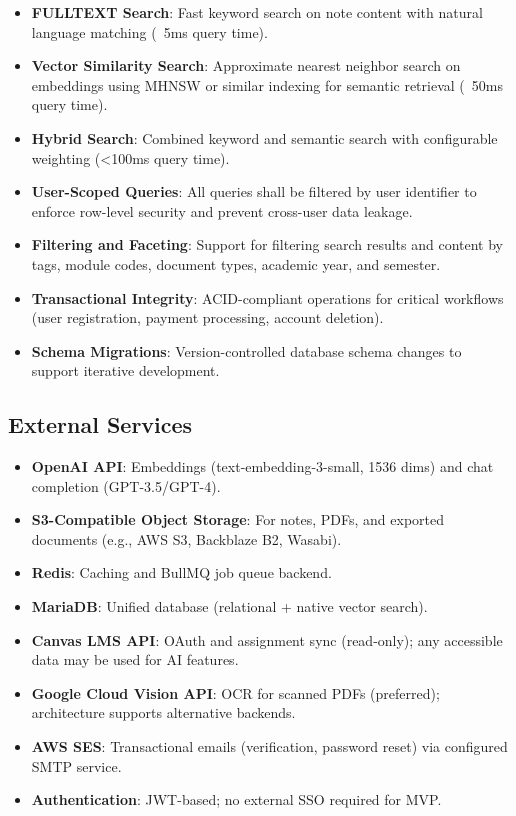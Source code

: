 \documentclass[12pt,a4paper]{article}
\begin{document}
\begin{itemize}
    \item \textbf{FULLTEXT Search}: Fast keyword search on note content with natural language matching (~5ms query time).
    \item \textbf{Vector Similarity Search}: Approximate nearest neighbor search on embeddings using MHNSW or similar indexing for semantic retrieval (~50ms query time).
    \item \textbf{Hybrid Search}: Combined keyword and semantic search with configurable weighting (<100ms query time).
    \item \textbf{User-Scoped Queries}: All queries shall be filtered by user identifier to enforce row-level security and prevent cross-user data leakage.
    \item \textbf{Filtering and Faceting}: Support for filtering search results and content by tags, module codes, document types, academic year, and semester.
    \item \textbf{Transactional Integrity}: ACID-compliant operations for critical workflows (user registration, payment processing, account deletion).
    \item \textbf{Schema Migrations}: Version-controlled database schema changes to support iterative development.
\end{itemize}

\subsection{External Services}

\begin{itemize}
    \item \textbf{OpenAI API}: Embeddings (text-embedding-3-small, 1536 dims) and chat completion (GPT-3.5/GPT-4).
    \item \textbf{S3-Compatible Object Storage}: For notes, PDFs, and exported documents (e.g., AWS S3, Backblaze B2, Wasabi).
    \item \textbf{Redis}: Caching and BullMQ job queue backend.
    \item \textbf{MariaDB}: Unified database (relational + native vector search).
    \item \textbf{Canvas LMS API}: OAuth and assignment sync (read-only); any accessible data may be used for AI features.
    \item \textbf{Google Cloud Vision API}: OCR for scanned PDFs (preferred); architecture supports alternative backends.
    \item \textbf{AWS SES}: Transactional emails (verification, password reset) via configured SMTP service.
    \item \textbf{Authentication}: JWT-based; no external SSO required for MVP.
\end{itemize}
\end{document}
